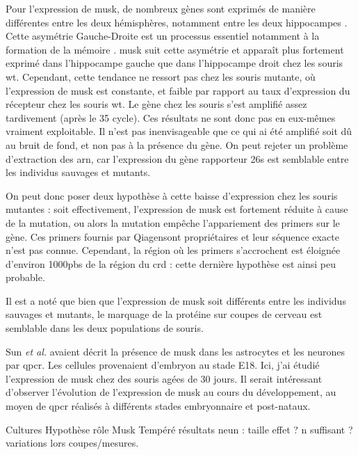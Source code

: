 Pour l'expression de \gls{musk}, de nombreux gènes sont exprimés de manière différentes entre les deux hémisphères, notamment entre les deux hippocampes \cite{Moskal2006}. Cette asymétrie Gauche-Droite est un processus essentiel notamment à la formation de la mémoire \cite{Shimbo2018}. \gls{musk} suit cette asymétrie et apparaît plus fortement exprimé dans l'hippocampe gauche que dans l'hippocampe droit chez les souris \gls{wt}. Cependant, cette tendance ne ressort pas chez les souris mutante, où l'expression de \gls{musk} est constante, et faible par rapport au taux d'expression du récepteur chez les souris \gls{wt}. Le gène chez les souris \mcrd s'est amplifié assez tardivement (après le 35 cycle). Ces résultats ne sont donc pas en eux-mêmes vraiment exploitable. Il n'est pas inenvisageable que ce qui ai été amplifié soit dû au bruit de fond, et non pas à la présence du gène. On peut rejeter un problème d'extraction des \acrshort{arn}, car l'expression du gène rapporteur \gls{26s} est semblable entre les individus sauvages et mutants. 

On peut donc poser deux hypothèse à cette baisse d'expression chez les souris mutantes : soit effectivement, l'expression de \gls{musk} est fortement réduite à cause de la mutation, ou alors la mutation empêche l'appariement des primers sur le gène. Ces primers fournis par Qiagen\texttrademark sont propriétaires et leur séquence exacte n'est pas connue. Cependant, la région où les primers s'accrochent est éloignée d'environ 1000pbs de la région du \gls{crd} : cette dernière hypothèse est ainsi peu probable.

Il est a noté que bien que l'expression de \gls{musk} soit différents entre les individus sauvages et mutants, le marquage de la protéine sur coupes de cerveau est semblable dans les deux populations de souris. 

Sun \emph{et al.} avaient décrit la présence de \gls{musk} dans les astrocytes et les neurones par \gls{qpcr}. Les cellules provenaient d'embryon au stade E18. Ici, j'ai étudié l'expression de \gls{musk} chez des souris agées de 30 jours. Il serait intéressant d'observer l'évolution de l'expression de \gls{musk} au cours du développement, au moyen de \gls{qpcr} réalisés à différents stades embryonnaire et post-nataux.

Cultures
Hypothèse rôle Musk
Tempéré résultats neun : taille effet ? n suffisant ? variations lors coupes/mesures.